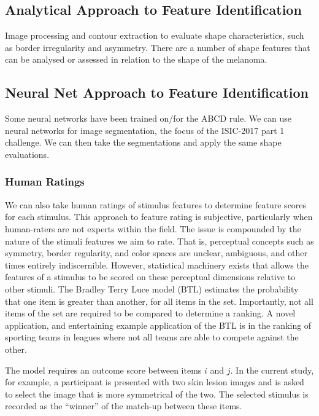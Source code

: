 \documentclass[a4paper, natbib, doc, 12pt]{apa7}
\begin{document}
\subsection{Analytical Approach to Feature Identification}
Image processing and contour extraction to evaluate shape characteristics, such as border irregularity and asymmetry. There are a number of shape features that can be analysed or assessed in relation to the shape of the melanoma.

\subsection{Neural Net Approach to Feature Identification}
Some neural networks have been trained on/for the ABCD rule. 
We can use neural networks for image segmentation, the focus of the ISIC-2017 part 1 challenge. We can then take the segmentations and apply the same shape evaluations. 

\subsubsection{Human Ratings}
We can also take human ratings of stimulus features to determine feature scores for each stimulus. This approach to feature rating is subjective, particularly when human-raters are not experts within the field. The issue is compounded by the nature of the stimuli features we aim to rate. That is, perceptual concepts such as symmetry, border regularity, and color spaces are unclear, ambiguous, and other times entirely indiscernible. However, statistical machinery exists that allows the features of a stimulus to be scored on these perceptual dimensions relative to other stimuli. The Bradley Terry Luce model (BTL) estimates the probability that one item is greater than another, for all items in the set. Importantly, not all items of the set are required to be compared to determine a ranking. A novel application, and entertaining example application of the BTL is in the ranking of sporting teams in leagues where not all teams are able to compete against the other. 

The model requires an outcome score between items $i$ and $j$. In the current study, for example, a participant is presented with two skin lesion images and is asked to select the image that is more symmetrical of the two. The selected stimulus is recorded as the ``winner'' of the match-up between these items. 
\end{document}
